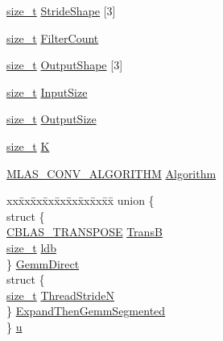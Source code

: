 \begin{DoxyCompactItemize}
\item 
\mbox{\hyperlink{mlasi_8h_a503efbc1c6e50825320ad909366b78ab}{size\+\_\+t}} \mbox{\hyperlink{structMLAS__CONV__PARAMETERS_a6b1d10719df51ec69f313a8505e8f861}{Stride\+Shape}} \mbox{[}3\mbox{]}
\item 
\mbox{\hyperlink{mlasi_8h_a503efbc1c6e50825320ad909366b78ab}{size\+\_\+t}} \mbox{\hyperlink{structMLAS__CONV__PARAMETERS_a649412aee7578ff77884dd6d3daf5ca6}{Filter\+Count}}
\item 
\mbox{\hyperlink{mlasi_8h_a503efbc1c6e50825320ad909366b78ab}{size\+\_\+t}} \mbox{\hyperlink{structMLAS__CONV__PARAMETERS_ab6cd3ee6987c32507bc39fd6e8c25770}{Output\+Shape}} \mbox{[}3\mbox{]}
\item 
\mbox{\hyperlink{mlasi_8h_a503efbc1c6e50825320ad909366b78ab}{size\+\_\+t}} \mbox{\hyperlink{structMLAS__CONV__PARAMETERS_a2ec4a7c94a6ecfa93a83d6f1de47ccb9}{Input\+Size}}
\item 
\mbox{\hyperlink{mlasi_8h_a503efbc1c6e50825320ad909366b78ab}{size\+\_\+t}} \mbox{\hyperlink{structMLAS__CONV__PARAMETERS_a1226bbcc57068f7f511e002cd62ff9b6}{Output\+Size}}
\item 
\mbox{\hyperlink{mlasi_8h_a503efbc1c6e50825320ad909366b78ab}{size\+\_\+t}} \mbox{\hyperlink{structMLAS__CONV__PARAMETERS_a7bc31b6b51f84372e4e244e542c749e3}{K}}
\item 
\mbox{\hyperlink{mlas_8h_ac248f7f0805a559ed62acf815486bec0}{M\+L\+A\+S\+\_\+\+C\+O\+N\+V\+\_\+\+A\+L\+G\+O\+R\+I\+T\+HM}} \mbox{\hyperlink{structMLAS__CONV__PARAMETERS_a7cfcd21049fa7e0ed88a8ba7a6448ac5}{Algorithm}}
\item 
\begin{tabbing}
xx\=xx\=xx\=xx\=xx\=xx\=xx\=xx\=xx\=\kill
union \{\\
\>struct \{\\
\>\>\mbox{\hyperlink{cblas_8h_a44dfaddb823648755b110dbad849c5a9}{CBLAS\_TRANSPOSE}} \mbox{\hyperlink{structMLAS__CONV__PARAMETERS_a45895bc5e82c804d23333fd0941e17dd}{TransB}}\\
\>\>\mbox{\hyperlink{mlasi_8h_a503efbc1c6e50825320ad909366b78ab}{size\_t}} \mbox{\hyperlink{structMLAS__CONV__PARAMETERS_afa7702e86c58857a9e26c1eb6c725c1d}{ldb}}\\
\>\} \mbox{\hyperlink{structMLAS__CONV__PARAMETERS_a802c36f2bfa039c1254765449c6e495d}{GemmDirect}}\\
\>struct \{\\
\>\>\mbox{\hyperlink{mlasi_8h_a503efbc1c6e50825320ad909366b78ab}{size\_t}} \mbox{\hyperlink{structMLAS__CONV__PARAMETERS_accc7b2e06741c86a63847d91f16a4fb4}{ThreadStrideN}}\\
\>\} \mbox{\hyperlink{structMLAS__CONV__PARAMETERS_ab5bedec8e43f31a045da79c2f245675c}{ExpandThenGemmSegmented}}\\
\} \mbox{\hyperlink{structMLAS__CONV__PARAMETERS_a0e5df7fd2b4d5cfe64ef2fae521118ce}{u}}\\

\end{tabbing}\end{DoxyCompactItemize}


